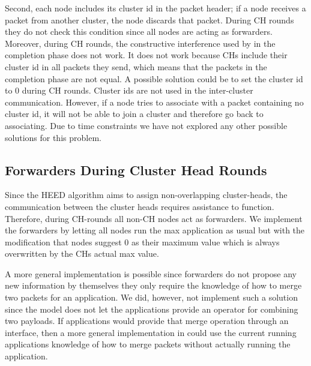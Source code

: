Second, each node includes its cluster id in the packet header; if a node receives a packet from another cluster, the node discards that packet. During CH rounds they do not check this condition since all nodes are acting as forwarders. Moreover, during CH rounds, the constructive interference used by \atwo{} in the completion phase does not work. It does not work because CHs include their cluster id in all packets they send, which means that the packets in the completion phase are not equal. A possible solution could be to set the cluster id to 0 during CH rounds. Cluster ids are not used in the inter-cluster communication. However, if a node tries to associate with a packet containing no cluster id, it will not be able to join a cluster and therefore go back to associating. Due to time constraints we have not explored any other possible solutions for this problem.

\subsection{Forwarders During Cluster Head Rounds}
Since the HEED algorithm aims to assign non-overlapping cluster-heads, the communication between the cluster heads requires assistance to function. Therefore, during CH-rounds all non-CH nodes act as forwarders. We implement the forwarders by letting all nodes run the max application as usual but with the modification that nodes suggest 0 as their maximum value which is always overwritten by the CHs actual max value.

A more general implementation is possible since forwarders do not propose any new information by themselves they only require the knowledge of how to merge two packets for an application. We did, however, not implement such a solution since the \atwo{} model does not let the applications provide an operator for combining two payloads. If applications would provide that merge operation through an interface, then a more general implementation in \atwo{} could use the current running applications knowledge of how to merge packets without actually running the application. 


